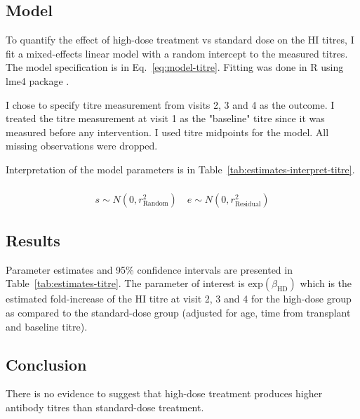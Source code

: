 \documentclass[11pt]{article}
\begin{document}
\subsection{Model}

To quantify the effect of high-dose treatment vs standard dose on the
HI titres, I fit a mixed-effects linear model with a random intercept
to the measured titres.
The model specification is in Eq.~\ref{eq:model-titre}.
Fitting was done in R \cite{R} using lme4 package \cite{lme4}.

I chose to specify titre measurement from visits 2, 3 and 4 as the outcome.
I treated the titre measurement at visit 1 as the "baseline" titre since
it was measured before any intervention. I used titre midpoints for the model.
All missing observations were dropped.

Interpretation of the model parameters is in
Table~\ref{tab:estimates-interpret-titre}.

\begin{equation}
  \begin{gathered}
    \label{eq:model-titre}
    \\
    s \sim N(0, r^2_{\text{Random}}) \quad e \sim N(0, r^2_{\text{Residual}})
  \end{gathered}
\end{equation}





\subsection{Results}

Parameter estimates and 95\% confidence intervals
are presented in Table~\ref{tab:estimates-titre}.
The parameter of interest is $\text{exp}(\beta_{\text{HD}})$
which is the estimated
fold-increase of the HI titre at visit 2, 3 and 4 for the high-dose group
as compared to the standard-dose group (adjusted for age, time from transplant
and baseline titre).



\subsection{Conclusion}

There is no evidence to suggest that high-dose treatment produces
higher antibody
titres than standard-dose treatment.
\end{document}
